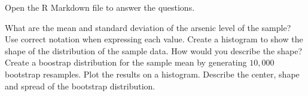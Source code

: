 Open the R Markdown file \href{https://ucdenver.instructure.com/files/14966546}{} to answer the questions. 


\bb
\ii What are the mean and standard deviation of the arsenic level of the sample? Use correct notation when expressing each value. \vfill
\ii Create a histogram to show the shape of the distribution of the sample data. How would you describe the shape? \vfill
\ii Create a boostrap distribution for the sample mean by generating $10,000$ bootstrap resamples. Plot the results on a histogram. \vfill
\ii Describe the center, shape and spread of the bootstrap distribution. \vfill
\ee
\ee






